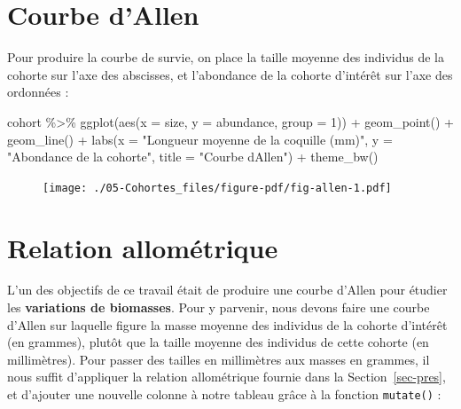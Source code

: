 \documentclass[
  a4paper,
  DIV=11,
  numbers=noendperiod,
  oneside]{scrreprt}
\newenvironment{Shaded}{}{}
\newcommand{\AttributeTok}[1]{\textcolor[rgb]{0.84,0.23,0.29}{#1}}
\newcommand{\DecValTok}[1]{\textcolor[rgb]{0.00,0.36,0.77}{#1}}
\newcommand{\FunctionTok}[1]{\textcolor[rgb]{0.44,0.26,0.76}{#1}}
\newcommand{\NormalTok}[1]{\textcolor[rgb]{0.14,0.16,0.18}{#1}}
\newcommand{\SpecialCharTok}[1]{\textcolor[rgb]{0.00,0.36,0.77}{#1}}
\newcommand{\StringTok}[1]{\textcolor[rgb]{0.01,0.18,0.38}{#1}}
\begin{document}
\hypertarget{courbe-dallen}{%
\section{Courbe d'Allen}\label{courbe-dallen}}

Pour produire la courbe de survie, on place la taille moyenne des
individus de la cohorte sur l'axe des abscisses, et l'abondance de la
cohorte d'intérêt sur l'axe des ordonnées :

\begin{Shaded}
\begin{Highlighting}[]
\NormalTok{cohort }\SpecialCharTok{\%\textgreater{}\%}
  \FunctionTok{ggplot}\NormalTok{(}\FunctionTok{aes}\NormalTok{(}\AttributeTok{x =}\NormalTok{ size, }\AttributeTok{y =}\NormalTok{ abundance, }\AttributeTok{group =} \DecValTok{1}\NormalTok{)) }\SpecialCharTok{+}
  \FunctionTok{geom\_point}\NormalTok{() }\SpecialCharTok{+}
  \FunctionTok{geom\_line}\NormalTok{() }\SpecialCharTok{+}
  \FunctionTok{labs}\NormalTok{(}\AttributeTok{x =} \StringTok{"Longueur moyenne de la coquille (mm)"}\NormalTok{,}
       \AttributeTok{y =} \StringTok{"Abondance de la cohorte"}\NormalTok{,}
       \AttributeTok{title =} \StringTok{"Courbe d\textquotesingle{}Allen"}\NormalTok{) }\SpecialCharTok{+}
  \FunctionTok{theme\_bw}\NormalTok{()}
\end{Highlighting}
\end{Shaded}

\begin{figure}[H]


{\centering \texttt{[image: ./05-Cohortes\_files/figure-pdf/fig-allen-1.pdf]}

}

\end{figure}

\hypertarget{relation-allomuxe9trique}{%
\section{Relation allométrique}\label{relation-allomuxe9trique}}

L'un des objectifs de ce travail était de produire une courbe d'Allen
pour étudier les \textbf{variations de biomasses}. Pour y parvenir, nous
devons faire une courbe d'Allen sur laquelle figure la masse moyenne des
individus de la cohorte d'intérêt (en grammes), plutôt que la taille
moyenne des individus de cette cohorte (en millimètres). Pour passer des
tailles en millimètres aux masses en grammes, il nous suffit d'appliquer
la relation allométrique fournie dans la Section~\ref{sec-pres}, et
d'ajouter une nouvelle colonne à notre tableau grâce à la fonction
\texttt{mutate()} :
\end{document}
